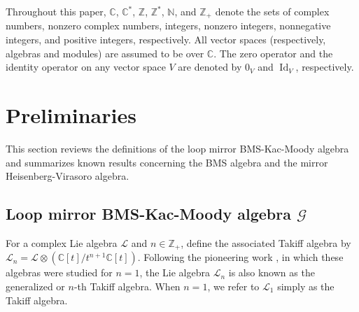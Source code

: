 \documentclass[12pt,reqno]{amsart}
\def\Z{\mathbb{Z}}
\def\N{\mathbb{N}}
\def\C{\mathbb{C}}
\numberwithin{equation}{section}
\begin{document}
 



Throughout this paper, $\C$, $\C^*$, $\Z$, $\Z^*$, $\N$, and $\Z_{+}$ denote the sets of complex numbers, nonzero complex numbers, integers, nonzero  integers, nonnegative integers, and positive integers, respectively. All vector spaces (respectively, algebras and modules) are assumed to be over $\C$. The zero operator and the identity operator on any vector space $V$ are denoted by $0_V$ and $\operatorname{Id}_{V}$, respectively.
 

\section{Preliminaries}  
This section reviews the definitions of the loop mirror BMS-Kac-Moody algebra and summarizes known results concerning the BMS algebra and the mirror Heisenberg-Virasoro algebra.

\subsection{\texorpdfstring{Loop mirror BMS-Kac-Moody algebra $\mathcal{G}$}{1}}

For a complex Lie algebra $\mathcal{L}$ and $n\in\mathbb Z_+$, define the associated Takiff algebra by $\mathcal L_n=\mathcal L\otimes(\mathbb C[t]/ t^{n+1}\mathbb C[t])$. Following the pioneering work \cite{T}, in which these algebras were studied for $n=1$, the Lie algebra $\mathcal{L}_{n}$ is also known as the generalized or $n$-th Takiff algebra. When $n=1$, we refer to $\mathcal L_1$ simply as the Takiff algebra.
\end{document}
